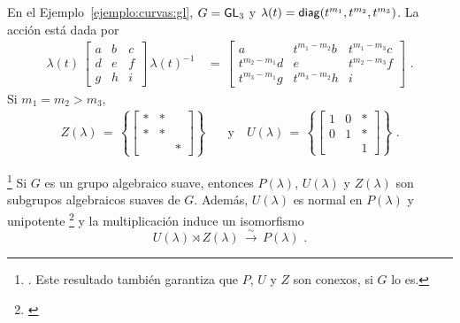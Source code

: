 \begin{ejemploCurvas}\label{ejemplo:unipotente:curvas:gl}
	En el Ejemplo~\ref{ejemplo:curvas:gl}, $G=\GL[3]$ y
	$\lambda(t)=\diag(t^{m_1},t^{m_2},t^{m_3})$. La acci\'{o}n est\'{a}
	dada por
	\begin{align*}
		\lambda(t)\,
			\begin{bmatrix}
				a & b & c \\
				d & e & f \\
				g & h & i
			\end{bmatrix}\,\lambda(t)^{-1} & \,=\,
		\begin{bmatrix}
			a & t^{m_1-m_2}b & t^{m_1-m_3}c \\
			t^{m_2-m_1}d & e & t^{m_2-m_3}f \\
			t^{m_3-m_1}g & t^{m_3-m_2}h & i
		\end{bmatrix}
		\text{ .}
	\end{align*}
	Si $m_1=m_2>m_3$,
	\begin{align*}
		Z(\lambda) \,=\,\left\{
			\begin{bmatrix}
				* & * & \\
				* & * & \\
				& & *
			\end{bmatrix}\right\} & \quad\text{y}\quad
		U(\lambda) \,=\,\left\{
			\begin{bmatrix}
				1 & 0 & * \\
				0 & 1 & * \\
				& & 1
			\end{bmatrix}\right\}
		\text{ .}
	\end{align*}
\end{ejemploCurvas}

\begin{teoParabolicoSemidirecto}\label{thm:parabolicosemidirecto}
	\footnote{
		\cite[Theorem~13.33]{MilneAlgebraicGroups}. Este resultado
		tambi\'{e}n garantiza que $P$, $U$ y $Z$ son conexos, si $G$ lo
		es.
	}
	Si $G$ es un grupo algebraico suave, entonces $P(\lambda)$,
	$U(\lambda)$ y $Z(\lambda)$ son subgrupos algebraicos suaves de $G$.
	Adem\'{a}s, $U(\lambda)$ es normal en $P(\lambda)$ y unipotente%
	\footnote{
		\cite[Example~14.13]{MilneAlgebraicGroups}
	}
	y la multiplicaci\'{o}n induce un isomorfismo
	\begin{equation}
		\label{eq:parabolicosemidirecto}
		U(\lambda)\rtimes Z(\lambda)\,\xrightarrow\sim\,P(\lambda)
		\text{ .}
	\end{equation}
\end{teoParabolicoSemidirecto}

